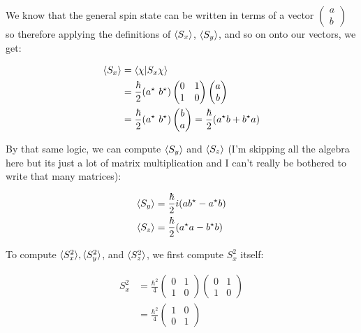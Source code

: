\documentclass[10pt]{article}
\begin{document}
    \begin{solution}
        We know that the general spin state can be written in terms of a vector $ \begin{pmatrix}
            a \\
            b 
            \end{pmatrix}$ so therefore applying the definitions of $\langle S_x \rangle$, $\langle S_y \rangle$, and so on onto our vectors, we get: 


        \begin{align*}
            \langle S_x \rangle &= \braket{\chi}{S_x \chi} \\
            &= \frac{\hbar}{2} (a^\star \ b^\star) \begin{pmatrix}
                0 & 1 \\
                1 & 0 
                \end{pmatrix}  \begin{pmatrix}
                    a \\
                    b 
                    \end{pmatrix}\\
            &= \frac{\hbar}{2}(a^\star \ b^\star) \begin{pmatrix}
                    b \\
                    a 
                    \end{pmatrix} = \frac{\hbar}{2}(a^\star b + b^\star a)
        \end{align*}

        By that same logic, we can compute $\langle S_y \rangle$ and $\langle S_z \rangle$ (I'm skipping all the algebra here but its just a lot of matrix multiplication and I can't really be bothered to write that many matrices): 

        \begin{align*}
            \langle S_y \rangle &= \frac{\hbar}{2} i(ab^\star - a^\star b)\\
            \langle S_z \rangle &= \frac{\hbar}{2} (a^\star a - b^\star b) 
        \end{align*}

        To compute $\langle S_x^2 \rangle, \langle S_y^2 \rangle$, and $\langle S_z^2 \rangle$, we first compute $S_x^2$ itself: 

        \begin{align*}
            S_x^2 &= \frac{\hbar^2}{4} \begin{pmatrix}
                0 & 1\\
                1 & 0
            \end{pmatrix} \begin{pmatrix}
                0 & 1\\
                1 & 0
            \end{pmatrix}\\
            &= \frac{\hbar^2}{4}\begin{pmatrix}
                1 & 0\\
                0 & 1
            \end{pmatrix}
        \end{align*}


\end{solution}
\end{document}
